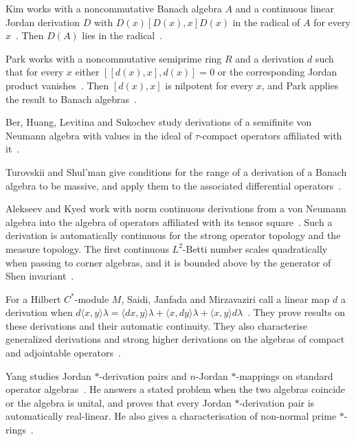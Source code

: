 Kim works with a noncommutative Banach algebra $A$ and a continuous linear
Jordan derivation $D$ with $D(x)[D(x),x]D(x)$ in the radical of $A$ for every
$x$~\cite{WlOnTheDerivationsOfSemiprimeRin2002}. Then $D(A)$ lies in the
radical~\cite{WlOnTheDerivationsOfSemiprimeRin2002}.

Park works with a noncommutative semiprime ring $R$ and a derivation
$d$ such that for every $x$ either $[[d(x),x],d(x)]=0$ or the corresponding
Jordan product vanishes~\cite{WlOnDerivationsInNoncommutativeS2005}. Then $[d(x),x]$ is nilpotent for every $x$, and Park
applies the result to Banach
algebras~\cite{WlOnDerivationsInNoncommutativeS2005}.

Ber, Huang, Levitina and Sukochev study derivations of a semifinite von
Neumann algebra with values in the ideal of $\tau$-compact operators
affiliated with it~\cite{WlDerivationsWithValuesInTheIdea2022}.

Turovskii and Shul'man give conditions for the range of a derivation of a
Banach algebra to be massive, and apply them to the associated differential
operators~\cite{WlConditionsForMassivenessOfTheR1993}.

Alekseev and Kyed work with norm continuous derivations from a von Neumann
algebra into the algebra of operators affiliated with its tensor square~\cite{WlMeasureContinuousDerivationsOn2013}. Such
a derivation is automatically continuous for the strong operator topology and
the measure topology. The first continuous $L^2$-Betti number scales
quadratically when passing to corner algebras, and it is bounded above by the
generator of Shen invariant~\cite{WlMeasureContinuousDerivationsOn2013}.

For a Hilbert $C^*$-module $M$, Saidi, Janfada and Mirzavaziri call a linear
map $d$ a derivation when $d\langle x,y\rangle\lambda=\langle
dx,y\rangle\lambda+\langle x,dy\rangle\lambda+\langle x,y\rangle d\lambda$~\cite{WlKindsOfDerivationsOnHilbertCSt2015}.
They prove results on these derivations and their automatic continuity. They
also characterise generalized derivations and strong higher derivations on the
algebras of compact and adjointable
operators~\cite{WlKindsOfDerivationsOnHilbertCSt2015}.

Yang studies Jordan $*$-derivation pairs and $n$-Jordan $*$-mappings on
standard operator algebras~\cite{WlJordanDerivationPairsOnStandar2005}. He answers a stated problem when the two algebras
coincide or the algebra is unital, and proves that every Jordan $*$-derivation
pair is automatically real-linear. He also gives a characterisation of
non-normal prime $*$-rings~\cite{WlJordanDerivationPairsOnStandar2005}.

